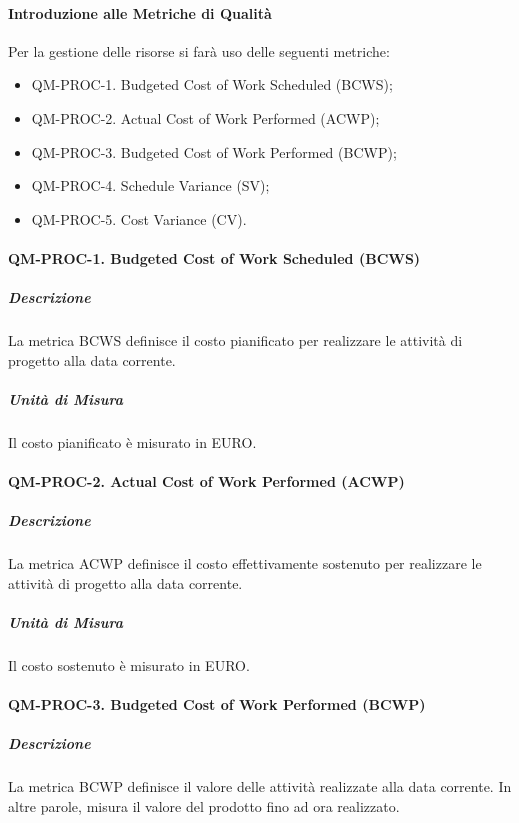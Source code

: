 			\paragraph{Introduzione alle Metriche di Qualità}

				Per la gestione delle risorse si farà uso delle seguenti metriche:

				\begin{itemize}
					\item QM-PROC-1. Budgeted Cost of Work Scheduled (BCWS);
					\item QM-PROC-2. Actual Cost of Work Performed (ACWP);
					\item QM-PROC-3. Budgeted Cost of Work Performed (BCWP);
					\item QM-PROC-4. Schedule Variance (SV);
					\item QM-PROC-5. Cost Variance (CV).
				\end{itemize}

			\paragraph{QM-PROC-1. Budgeted Cost of Work Scheduled (BCWS)}

				\subparagraph{Descrizione}
				La metrica BCWS definisce il costo pianificato per realizzare le attività di progetto alla data corrente.

				\subparagraph{Unità di Misura}
				Il costo pianificato è misurato in EURO.

			\paragraph{QM-PROC-2. Actual Cost of Work Performed (ACWP)}

				\subparagraph{Descrizione}
				La metrica ACWP definisce il costo effettivamente sostenuto per realizzare le attività di progetto alla data corrente.

				\subparagraph{Unità di Misura}
				Il costo sostenuto è misurato in EURO.

			\paragraph{QM-PROC-3. Budgeted Cost of Work Performed (BCWP)}

				\subparagraph{Descrizione}
				La metrica BCWP definisce il valore delle attività realizzate alla data corrente. In altre parole, misura il valore del prodotto fino ad ora realizzato.

